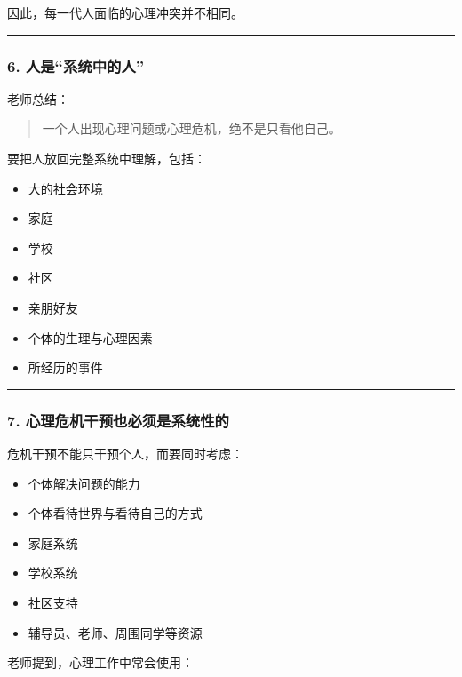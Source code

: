 \documentclass[
  chinese,
  9pt,
  a4paper,
]{ctexart}
\providecommand{\tightlist}{%
  \setlength{\itemsep}{0pt}\setlength{\parskip}{0pt}}
\begin{document}
因此，每一代人面临的心理冲突并不相同。

\begin{center}\rule{0.5\linewidth}{0.5pt}\end{center}

\subsubsection{6.
人是``系统中的人''}\label{ux4ebaux662fux7cfbux7edfux4e2dux7684ux4eba}

老师总结：

\begin{quote}
一个人出现心理问题或心理危机，绝不是只看他自己。
\end{quote}

要把人放回完整系统中理解，包括：

\begin{itemize}
\tightlist
\item
  大的社会环境
\item
  家庭
\item
  学校
\item
  社区
\item
  亲朋好友
\item
  个体的生理与心理因素
\item
  所经历的事件
\end{itemize}

\begin{center}\rule{0.5\linewidth}{0.5pt}\end{center}

\subsubsection{7.
心理危机干预也必须是系统性的}\label{ux5fc3ux7406ux5371ux673aux5e72ux9884ux4e5fux5fc5ux987bux662fux7cfbux7edfux6027ux7684}

危机干预不能只干预个人，而要同时考虑：

\begin{itemize}
\tightlist
\item
  个体解决问题的能力
\item
  个体看待世界与看待自己的方式
\item
  家庭系统
\item
  学校系统
\item
  社区支持
\item
  辅导员、老师、周围同学等资源
\end{itemize}

老师提到，心理工作中常会使用：
\end{document}
